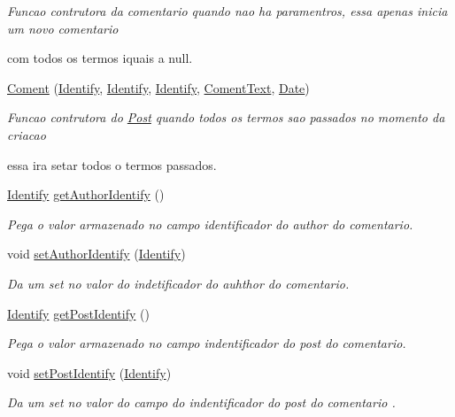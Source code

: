 \begin{DoxyCompactItemize}
\begin{DoxyCompactList}\small\item\em Funcao contrutora da comentario quando nao ha paramentros, essa apenas inicia um novo comentario \par
 com todos os termos iquais a null. \end{DoxyCompactList}\item 
\hyperlink{class_coment_ae57275f77601a77eaa9b984589e025f2}{Coment} (\hyperlink{class_identify}{Identify}, \hyperlink{class_identify}{Identify}, \hyperlink{class_identify}{Identify}, \hyperlink{class_coment_text}{Coment\-Text}, \hyperlink{class_date}{Date})
\begin{DoxyCompactList}\small\item\em Funcao contrutora do \hyperlink{class_post}{Post} quando todos os termos sao passados no momento da criacao \par
 essa ira setar todos o termos passados. \end{DoxyCompactList}\item 
\hyperlink{class_identify}{Identify} \hyperlink{class_coment_a4006ae63196c19c5fb6feed70f6588ff}{get\-Author\-Identify} ()
\begin{DoxyCompactList}\small\item\em Pega o valor armazenado no campo identificador do author do comentario. \end{DoxyCompactList}\item 
void \hyperlink{class_coment_a29f4700734b5b9d50c17357876b3d96e}{set\-Author\-Identify} (\hyperlink{class_identify}{Identify})
\begin{DoxyCompactList}\small\item\em Da um set no valor do indetificador do auhthor do comentario. \end{DoxyCompactList}\item 
\hyperlink{class_identify}{Identify} \hyperlink{class_coment_a3fb57e3fdaf0e3c1e9d025af8e197e99}{get\-Post\-Identify} ()
\begin{DoxyCompactList}\small\item\em Pega o valor armazenado no campo indentificador do post do comentario. \end{DoxyCompactList}\item 
void \hyperlink{class_coment_a65bccaa5ff5ef75e22b19e41f1b2db08}{set\-Post\-Identify} (\hyperlink{class_identify}{Identify})
\begin{DoxyCompactList}\small\item\em Da um set no valor do campo do indentificador do post do comentario . \end{DoxyCompactList}\item 

\end{DoxyCompactItemize}

